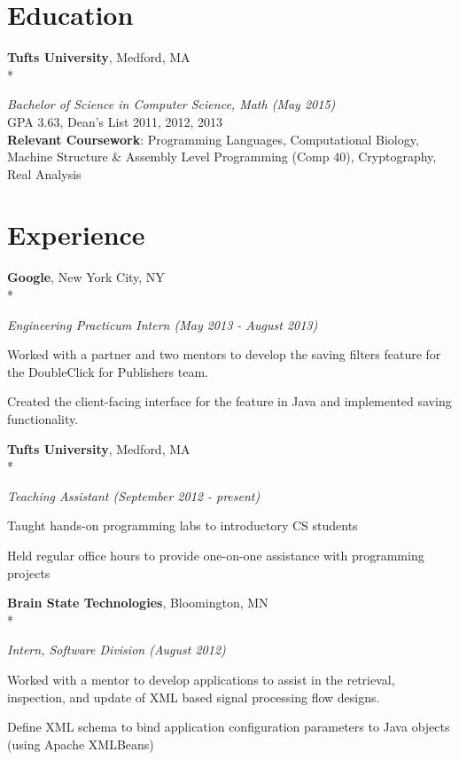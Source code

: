 \documentclass{article}
\newcommand{\position}[2]{
  \textit{#1 (#2)}
}
\newcommand{\affiliation}[2]{
  \textbf{#1}, #2 \\*
}
\newenvironment{achievements}{
  \begin{compactitem} }{
  \end{compactitem}
}
\newcommand{\skill}[2]{
  \textbf{#1}: #2
}
\begin{document}
\section*{Education}
  \affiliation{Tufts University}                             {Medford, MA}
    \position{Bachelor of Science in Computer Science, Math} {May 2015} \\
  GPA 3.63, Dean's List 2011, 2012, 2013 \\
  \skill{Relevant Coursework}
        {Programming Languages, Computational Biology, Machine Structure \&
        Assembly Level Programming (Comp 40), Cryptography, Real Analysis}

\section*{Experience}
  \affiliation{Google}                       {New York City, NY}
    \position {Engineering Practicum Intern} {May 2013 - August 2013}
    \begin{achievements}
      \item {\raggedright Worked with a partner and two mentors to develop the 
              saving filters feature for the DoubleClick for Publishers team.}
      \item {\raggedright Created the client-facing interface for the feature in
              Java and implemented saving functionality.}
    \end{achievements}
    \smallskip

  \affiliation{Tufts University}   {Medford, MA}
    \position {Teaching Assistant} {September 2012 - present}
    \begin{achievements}
      \item Taught hands-on programming labs to introductory CS students
      \item Held regular office hours to provide one-on-one assistance with
            programming projects
    \end{achievements}
    \smallskip

  \affiliation{Brain State Technologies}  {Bloomington, MN}
    \position {Intern, Software Division} {August 2012}
    \begin{achievements}
      \item Worked with a mentor to develop applications to assist in the
            retrieval, inspection, and update of XML based signal processing 
            flow designs.
      \item Define XML schema to bind application configuration parameters to 
            Java objects (using Apache XMLBeans)
    \end{achievements}
\end{document}
